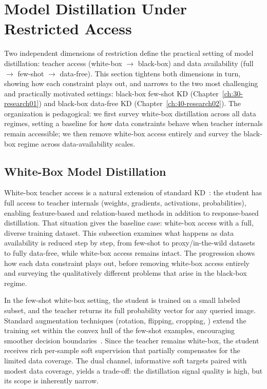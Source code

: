 \section{Model Distillation Under Restricted Access} \label{sec:24-background-kdrestricted}

Two independent dimensions of restriction define the practical setting of model distillation: teacher access (white-box $\to$ black-box) and data availability (full $\to$ few-shot $\to$ data-free).
This section tightens both dimensions in turn, showing how each constraint plays out, and narrows to the two most challenging and practically motivated settings: black-box few-shot \ac{KD} (Chapter~\ref{ch:30-research01}) and black-box data-free \ac{KD} (Chapter~\ref{ch:40-research02}).
The organization is pedagogical: we first survey white-box distillation across all data regimes, setting a baseline for how data constraints behave when teacher internals remain accessible; we then remove white-box access entirely and survey the black-box regime across data-availability scales.

\subsection{White-Box Model Distillation} \label{sec:24-background-kdrestricted-whitebox}
\begin{foldable}
  White-box teacher access is a natural extension of standard \ac{KD}~\cite{hinton2015distilling}: the student has full access to teacher internals (weights, gradients, activations, probabilities), enabling feature-based and relation-based methods in addition to response-based distillation.
  That situation gives the baseline case: white-box access with a full, diverse training dataset.
  This subsection examines what happens as data availability is reduced step by step, from few-shot to proxy/in-the-wild datasets to fully data-free, while white-box access remains intact.
  The progression shows how each data constraint plays out, before removing white-box access entirely and surveying the qualitatively different problems that arise in the black-box regime.
\end{foldable}

\begin{foldable}
  In the few-shot white-box setting, the student is trained on a small labeled subset, and the teacher returns its full probability vector for any queried image.
  Standard augmentation techniques (rotation, flipping, cropping, \etc) extend the training set within the convex hull of the few-shot examples, encouraging smoother decision boundaries~\cite{shorten2019survey}.
  Since the teacher remains white-box, the student receives rich per-sample soft supervision that partially compensates for the limited data coverage.
  The dual channel, informative soft targets paired with modest data coverage, yields a trade-off: the distillation signal quality is high, but its scope is inherently narrow.
\end{foldable}

